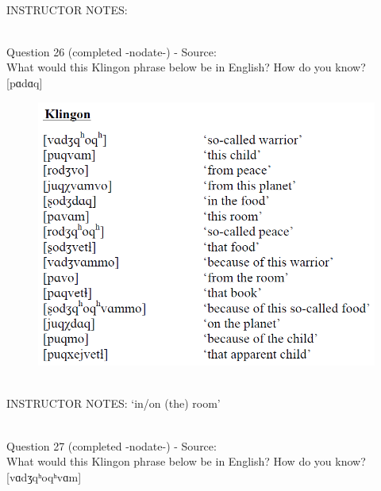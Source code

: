 \documentclass[12pt]{article}
\begin{document}
~\\
INSTRUCTOR NOTES: 


~\\

{\large Question 26} (completed -nodate-) - Source: \\

What would this Klingon phrase below be in English? How do you know?\\

{[pɑdɑq]}

\begin{figure}[H]
\includegraphics{../images/klingon.png}
\end{figure}

~\\
INSTRUCTOR NOTES: ‘in/on (the) room’


~\\

{\large Question 27} (completed -nodate-) - Source: \\

What would this Klingon phrase below be in English? How do you know?\\

{[vɑdʒqʰoqʰvɑm]}
\end{document}
